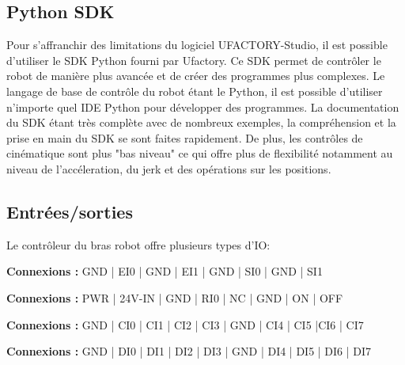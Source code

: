 \subsection{Python SDK}
Pour s'affranchir des limitations du logiciel UFACTORY-Studio, il est possible d'utiliser le SDK Python \cite{PythonSDK} fourni par Ufactory. Ce SDK permet de contrôler le robot de manière plus avancée et de créer des programmes plus complexes. Le langage de base de contrôle du robot étant le Python, il est possible d'utiliser n'importe quel IDE Python pour développer des programmes. La documentation du SDK étant très complète avec de nombreux exemples, la compréhension et la prise en main du SDK se sont faites rapidement. De plus, les contrôles de cinématique sont plus "bas niveau" ce qui offre plus de flexibilité notamment au niveau de l'accéleration, du \gls{jerk} et des opérations sur les positions.

\subsection{Entrées/sorties}
Le contrôleur du bras robot offre plusieurs types d'IO:


\begin{tcolorbox}[colframe=black, colback=SafetyColor, title=Safety]
\textbf{Connexions :} GND | EI0 | GND | EI1 | GND | SI0 | GND | SI1
\end{tcolorbox}

\begin{tcolorbox}[colframe=black, colback=PowerColor, title=Power]
\textbf{Connexions :} PWR | 24V-IN | GND | RI0 | NC | GND | ON | OFF
\end{tcolorbox}

\begin{tcolorbox}[colframe=black, colback=ConfigInputColor, title=Configurable Inputs]
\textbf{Connexions :} GND | CI0 | CI1 | CI2 | CI3 | GND | CI4 | CI5 |CI6 | CI7
\end{tcolorbox}

\begin{tcolorbox}[colframe=black, colback=DigitalInputColor, title=Digital Inputs]
\textbf{Connexions :} GND |  DI0 | DI1 | DI2 | DI3 | GND | DI4 | DI5 | DI6 | DI7
\end{tcolorbox}

